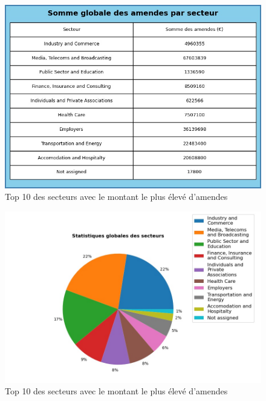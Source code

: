 \documentclass[french]{article}
\begin{document}
		
	\begin{multicols}{2}
	\begin{figure}
		[H]\centering\includegraphics[width=1.0\linewidth]{graphs/sector_data_year_fines}
		\caption{Top 10 des secteurs avec le montant le plus élevé d'amendes}
	\end{figure}
	\begin{figure}
		[H]\centering\includegraphics[width=1\linewidth]{graphs/sector_data_year}
		\caption{Top 10 des secteurs avec le montant le plus élevé d'amendes}
	 \end{figure}
	
	\end{multicols}
\end{document}
